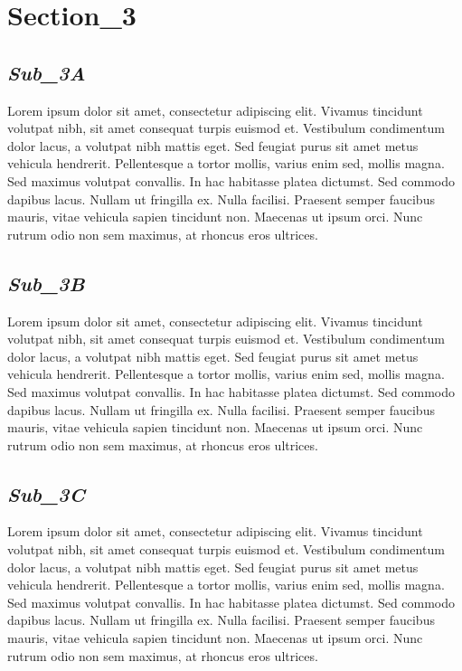 \documentclass[a4paper]{article}
\begin{document}
\newpage
\section*{Section\_3}
	\begin{minipage}{0.9\textwidth}
		
		\subsection*{\textit{Sub\_3A}}
		Lorem ipsum dolor sit amet, consectetur adipiscing elit. Vivamus tincidunt volutpat nibh, sit amet consequat turpis euismod et. Vestibulum condimentum dolor lacus, a volutpat nibh mattis eget. Sed feugiat purus sit amet metus vehicula hendrerit. Pellentesque a tortor mollis, varius enim sed, mollis magna. Sed maximus volutpat convallis. In hac habitasse platea dictumst. Sed commodo dapibus lacus. Nullam ut fringilla ex. Nulla facilisi. Praesent semper faucibus mauris, vitae vehicula sapien tincidunt non. Maecenas ut ipsum orci. Nunc rutrum odio non sem maximus, at rhoncus eros ultrices.
		
		\subsection*{\textit{Sub\_3B}}
		Lorem ipsum dolor sit amet, consectetur adipiscing elit. Vivamus tincidunt volutpat nibh, sit amet consequat turpis euismod et. Vestibulum condimentum dolor lacus, a volutpat nibh mattis eget. Sed feugiat purus sit amet metus vehicula hendrerit. Pellentesque a tortor mollis, varius enim sed, mollis magna. Sed maximus volutpat convallis. In hac habitasse platea dictumst. Sed commodo dapibus lacus. Nullam ut fringilla ex. Nulla facilisi. Praesent semper faucibus mauris, vitae vehicula sapien tincidunt non. Maecenas ut ipsum orci. Nunc rutrum odio non sem maximus, at rhoncus eros ultrices.
		
		\subsection*{\textit{Sub\_3C}}
		Lorem ipsum dolor sit amet, consectetur adipiscing elit. Vivamus tincidunt volutpat nibh, sit amet consequat turpis euismod et. Vestibulum condimentum dolor lacus, a volutpat nibh mattis eget. Sed feugiat purus sit amet metus vehicula hendrerit. Pellentesque a tortor mollis, varius enim sed, mollis magna. Sed maximus volutpat convallis. In hac habitasse platea dictumst. Sed commodo dapibus lacus. Nullam ut fringilla ex. Nulla facilisi. Praesent semper faucibus mauris, vitae vehicula sapien tincidunt non. Maecenas ut ipsum orci. Nunc rutrum odio non sem maximus, at rhoncus eros ultrices.
		
	\end{minipage}
\end{document}
